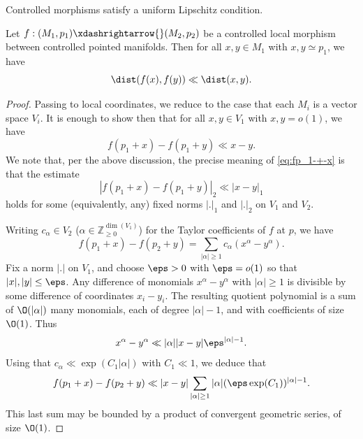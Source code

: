 Controlled morphisms satisfy a uniform Lipschitz condition.
\begin{lemma}\label{lem:controlled-uniform-continuity-origin}
  Let $f : (M_1, p_1) \xdashrightarrow{} (M_2, p_2)$ be a controlled local morphism between controlled pointed manifolds.  Then for all $x,y \in M_1$ with $x,y \simeq p_1$, we have
  \begin{equation*}
    \dist(f(x), f(y)) \ll \dist(x,y).
  \end{equation*}
\end{lemma}
\begin{proof}
  Passing to local coordinates, we reduce to the case that each $M_i$ is a vector space $V_i$.  It is enough to show then that for all $x, y \in V_1$ with $x, y = o(1)$, we have
  \begin{equation}\label{eq:fp_1-+-x}
    f(p_1 + x) - f(p_1 + y) \ll x - y.
  \end{equation}
  We note that, per the above discussion, the precise meaning of \eqref{eq:fp_1-+-x} is that the estimate
  \begin{equation*}
    |f(p_1 + x) - f(p_1 + y)|_2 \ll |x - y|_1
  \end{equation*}
  holds for some (equivalently, any) fixed norms $|.|_1$ and $|.|_2$ on $V_1$ and $V_2$.

  Writing $c_\alpha \in V_2$ ($\alpha \in \mathbb{Z}_{\geq 0}^{\dim(V_1)}$) for the Taylor coefficients of $f$ at $p$, we have
  \begin{equation*}
    f(p_1 + x) - f(p_2 + y) = \sum_{|\alpha| \geq 1} c_\alpha (x^\alpha - y^\alpha).
  \end{equation*}
  Fix a norm $|.|$ on $V_1$, and choose $\eps > 0$ with $\eps = o(1)$ so that $|x|, |y| \leq \eps$.  Any difference of monomials $x^\alpha - y^\alpha$ with $|\alpha| \geq 1$ is divisible by some difference of coordinates $x_i - y_i$.  The resulting quotient polynomial is a sum of $\O(|\alpha|)$ many monomials, each of degree $|\alpha| -1$, and with coefficients of size $\O(1)$.  Thus
  \begin{equation*}
    x^\alpha - y^\alpha \ll |\alpha| |x-y| \eps^{|\alpha| - 1}.
  \end{equation*}
  Using that $c_\alpha \ll \exp(C_1 |\alpha|)$ with $C_1 \ll 1$, we deduce that
  \begin{equation*}
    f (p_1 + x) - f (p_2 + y) \ll |x-y| \sum_{|\alpha| \geq 1} |\alpha| (\eps \exp(C_1))^{|\alpha|-1}.
  \end{equation*}
  This last sum may be bounded by a product of convergent geometric series, of size $\O(1)$.
\end{proof}

